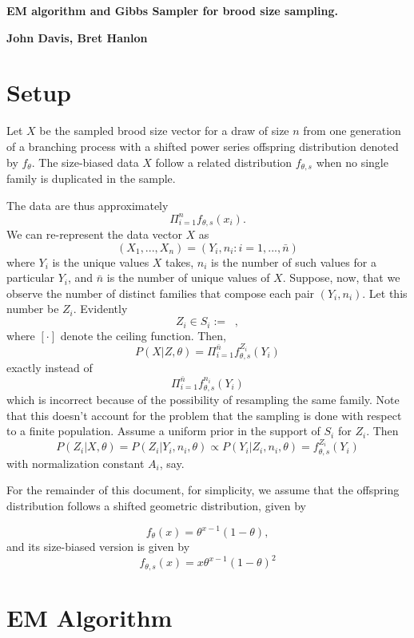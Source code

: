 \documentclass[11 pt]{article}
\renewcommand{\th}{\theta}
\newcommand{\fbr}[1]{ \mathop{ \left\{ #1 \right\} } }
\newcommand{\Title}[1]{\begin{center}{\Large \bf #1} \end{center}}
\newcommand{\fth}{f_{\th}}
\newcommand{\fths}{f_{\th,s}}
\begin{document}
\Title{EM algorithm and Gibbs Sampler for brood size sampling.}

\Title{John Davis, Bret Hanlon}

\section{Setup}
Let $X$ be the sampled brood size vector for a draw of size $n$ from one generation of a branching process with a shifted power series offspring distribution denoted by $\fth$. The size-biased data $X$ follow a related distribution $\fths$ when no single family is duplicated in the sample. 

The data are thus approximately 
\[
\Pi_{i=1}^n \fths(x_i).
\]
We can re-represent the data vector $X$ as 
\[
(X_1,...,X_n) = (Y_i,n_i : i=1,...,\bar{n})
\]
where $Y_i$ is the unique values $X$ takes, $n_i$ is the number of such values for a particular $Y_i$, and $\bar{n}$ is the number of unique values of $X$. Suppose, now, that we observe the number of distinct families that compose each pair $(Y_i,n_i)$. Let this number be $Z_i$. Evidently
\[
Z_i \in S_i:= \fbr{ [n_i / y_i],...,n_i},
\]
where $[\cdot]$ denote the ceiling function.  Then, 
\[
P(X|Z,\th) = \Pi_{i=1}^{\bar{n}} \fths^{Z_i}(Y_i)
\]
exactly instead of
\[
\Pi_{i=1}^{\bar{n}} \fths^{n_i}(Y_i)
\]
which is incorrect because of the possibility of resampling the same family. Note that this doesn't account for the problem that the sampling is done with respect to a finite population.  Assume a uniform prior in the support of $S_i$ for $Z_i$. Then
\[
P(Z_i|X,\th) = P(Z_i|Y_i,n_i,\th) \propto P(Y_i|Z_i,n_i,\th) = \fths^{Z_i}(Y_i)
\]
with normalization constant $A_i$, say.

For the remainder of this document, for simplicity, we assume that the offspring distribution follows a shifted geometric distribution, given by

\[
\fth(x) = \th^{x -1} (1 - \th),
\]
and its size-biased version is given by
\[
\fths(x) = x \th^{x - 1} (1 - \th)^2
\]

\section{EM Algorithm}
\end{document}
